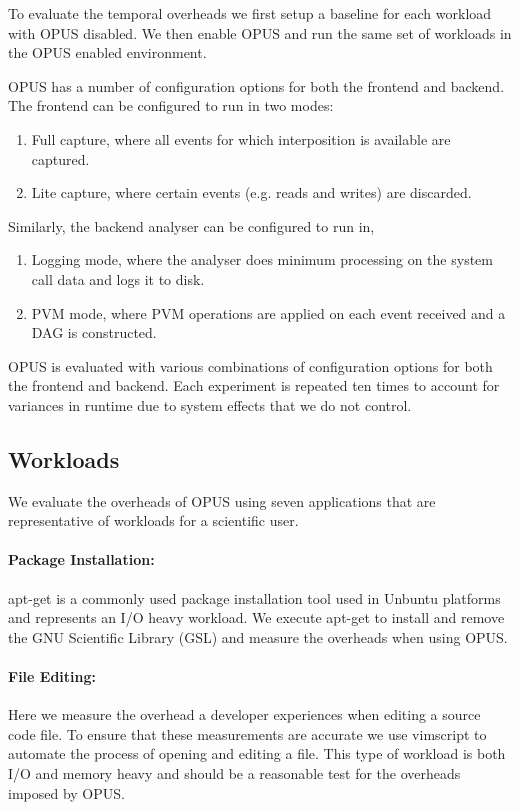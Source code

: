 \documentclass[withindex,glossary]{cam-thesis}
\begin{document}

To evaluate the temporal overheads we first setup a baseline for each workload with OPUS disabled.
We then enable OPUS and run the same set of workloads in the OPUS enabled environment.

OPUS has a number of configuration options for both the frontend and backend.
The frontend can be configured to run in two modes:
\begin{enumerate}
\item Full capture, where all events for which interposition is available are captured.
\item Lite capture, where certain events (e.g. reads and writes) are discarded.
\end{enumerate}

Similarly, the backend analyser can be configured to run in,
\begin{enumerate}
\item Logging mode, where the analyser does minimum processing on the system call data and logs it to disk.
\item PVM mode, where PVM operations are applied on each event received and a DAG is constructed.
\end{enumerate}

OPUS is evaluated with various combinations of configuration options for both the frontend and backend.
Each experiment is repeated ten times to account for variances in runtime due to system effects that we do not control.

\subsection{Workloads}
We evaluate the overheads of OPUS using seven applications that are representative of workloads for a scientific user.

\paragraph{Package Installation:} apt-get is a commonly used package installation tool used in Unbuntu platforms and represents an I/O heavy workload.
We execute apt-get to install and remove the GNU Scientific Library (GSL) and measure the overheads when using OPUS.

\paragraph{File Editing:} Here we measure the overhead a developer experiences when editing a source code file.
To ensure that these measurements are accurate we use vimscript to automate the process of opening and editing a file.
This type of workload is both I/O and memory heavy and should be a reasonable test for the overheads imposed by OPUS.
\end{document}
